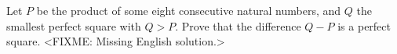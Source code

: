 \problem{}
Let $P$ be the product of some eight consecutive natural numbers, and $Q$ the smallest
perfect square with $Q > P$.
Prove that the difference $Q - P$ is a perfect square.
\solution
<FIXME: Missing English solution.>
\endproblem
